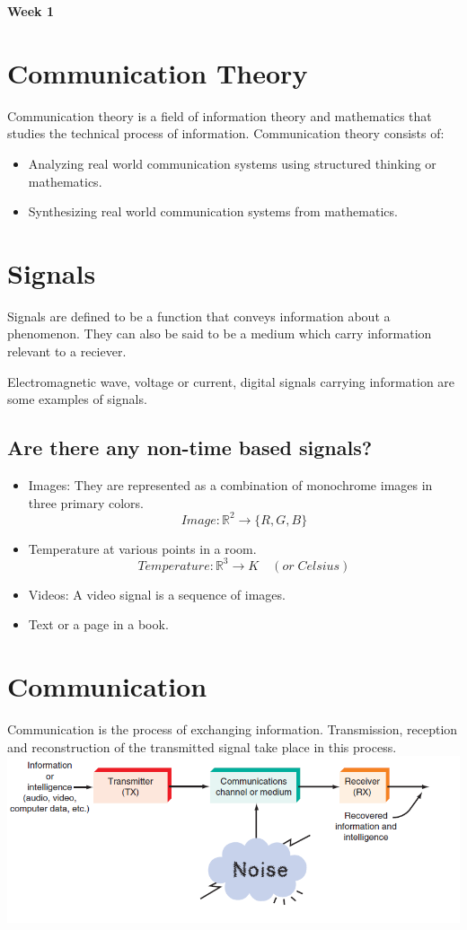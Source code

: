 \documentclass{article}
\begin{document}
\begin{center}
\textbf{\huge{Week 1}}
\end{center}
\section{Communication Theory}

Communication theory is a field of information theory and mathematics that studies the technical process of information.
Communication theory consists of:
\begin{itemize}
    \item Analyzing real world communication systems using structured thinking or mathematics.
    \item Synthesizing real world communication systems from mathematics.
\end{itemize}

\section{Signals}
Signals are defined to be a function that conveys information about a phenomenon.
They can also be said to be a medium which carry information relevant to a reciever.

Electromagnetic wave, voltage or current, digital signals carrying information are some examples of signals.

\subsection{Are there any non-time based signals?}
\begin{itemize}
    \item Images: They are represented as a combination of  monochrome images in three primary colors.
    $$ Image: \mathbb{R}^2 \rightarrow \{ R, G, B\}$$
    \item Temperature at various points in a room.
    $$ Temperature:\mathbb{R}^3 \rightarrow K \quad(or\; Celsius)$$
    \item Videos:  A video signal is a sequence of images.
    \item Text or a page in a book.
\end{itemize}

\section{Communication}
Communication is the process of exchanging information. Transmission, reception and reconstruction of the transmitted signal take place in this process.
\includegraphics[width=\textwidth]{ptp.png}
\end{document}
